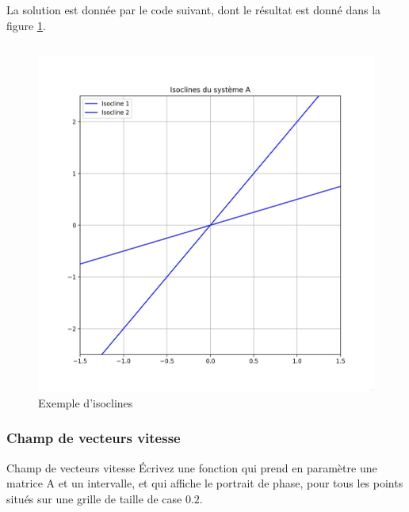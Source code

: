                 La solution est donnée par le code suivant, dont le résultat est donné dans la figure \ref{fig:isoclines2}.
                \inputminted{python}{codes/isoclines.py}
                \begin{figure}[ht!]
                    \centering
                    \includegraphics[width=\textwidth]{images/isoclines2.jpg}
                    \caption{Exemple d'isoclines}
                    \label{fig:isoclines2}
                \end{figure}
                
            \subsubsection{Champ de vecteurs vitesse}
                \begin{exercise}{Champ de vecteurs vitesse}
                    Écrivez une fonction  qui prend en paramètre une matrice A et un intervalle, et qui affiche le portrait de phase, pour tous les points situés sur une grille de taille de case $0.2$.
                \end{exercise}

